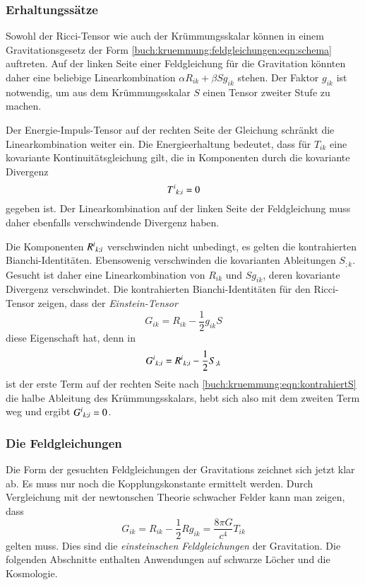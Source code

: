 %
%
\subsubsection{Erhaltungssätze}
Sowohl der Ricci-Tensor wie auch der Krümmungsskalar können in einem
Gravitationsgesetz der Form \eqref{buch:kruemmung:feldgleichungen:eqn:schema}
auftreten.
Auf der linken Seite einer Feldgleichung für die Gravitation könnten daher
eine beliebige Linearkombination $\alpha R_{ik}+\beta Sg_{ik}$ stehen.
Der Faktor $g_{ik}$ ist notwendig, um aus dem Krümmungsskalar $S$ einen
Tensor zweiter Stufe zu machen.

Der Energie-Impuls-Tensor auf der rechten Seite der Gleichung schränkt
die Linearkombination weiter ein.
Die Energieerhaltung bedeutet, dass für $T_{ik}$ eine kovariante 
Kontinuitätsgleichung gilt, die in Komponenten durch die kovariante
Divergenz
\[
T^i\mathstrut_{k;i}
=
0
\]
gegeben ist.
Der Linearkombination auf der linken Seite der Feldgleichung muss daher
ebenfalls verschwindende Divergenz haben.

Die Komponenten $R^i\mathstrut_{k;i}$ verschwinden nicht unbedingt,
es gelten die kontrahierten Bianchi-Identitäten.
Ebensowenig verschwinden die kovarianten Ableitungen $S_{;k}$.
Gesucht ist daher eine Linearkombination von $R_{ik}$ und $Sg_{ik}$,
deren kovariante Divergenz verschwindet.
Die kontrahierten Bianchi-Identitäten für den Ricci-Tensor zeigen, dass  der
\emph{Einstein-Tensor}
\[
G_{ik}
=
R_{ik}
-\frac12 g_{ik}S
\]
diese Eigenschaft hat, denn in
\[
G^i\mathstrut_{k;i}
=
R^i\mathstrut_{k;i}
-
\frac12 S_{;k}
\]
ist der erste Term auf der rechten Seite
nach \eqref{buch:kruemmung:eqn:kontrahiertS}
die halbe Ableitung des Krümmungsskalars, hebt sich also mit dem
zweiten Term weg und ergibt $G^i\mathstrut_{k;i}=0$.

%
%
\subsubsection{Die Feldgleichungen}
Die Form der gesuchten Feldgleichungen der Gravitations zeichnet sich
jetzt klar ab.
Es muss nur noch die Kopplungskonstante ermittelt werden.
Durch Vergleichung mit der newtonschen Theorie schwacher Felder 
kann man zeigen, dass 
\begin{equation}
G_{ik}
=
R_{ik}
-
\frac12 Rg_{ik}
=
\frac{8\pi G}{c^4}T_{ik}
\label{buch:kruemmung:feldgleichung:eqn:feldgleichung}
\end{equation}
gelten muss.
Dies sind die \emph{einsteinschen Feldgleichungen} der Gravitation.
Die folgenden Abschnitte enthalten Anwendungen auf schwarze Löcher
und die Kosmologie.

